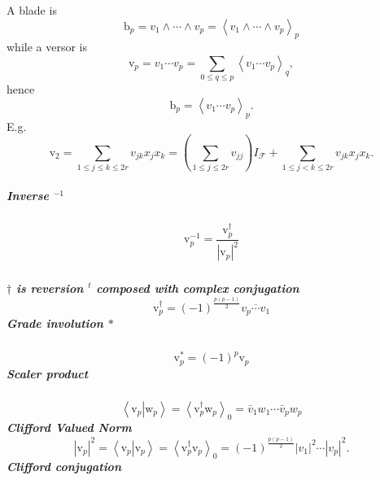 \documentclass[aps,preprint]{revtex4}%
\begin{document}
A blade is
\begin{equation}
\mathrm{b}_{p}=v_{1}\wedge\cdots\wedge v_{p}=\left\langle v_{1}\wedge
\cdots\wedge v_{p}\right\rangle _{p}%
\end{equation}
while a versor is
\begin{equation}
\mathrm{v}_{p}=v_{1}\cdots v_{p}=\sum_{0\leq q\leq p}\left\langle v_{1}\cdots
v_{p}\right\rangle _{q},
\end{equation}
hence
\begin{equation}
\mathrm{b}_{p}=\left\langle v_{1}\cdots v_{p}\right\rangle _{p}.
\end{equation}
E.g.%
\begin{equation}
\mathrm{v}_{2}=\sum_{1\leq j\leq k\leq2r}v_{jk}x_{j}x_{k}=\left(  \sum_{1\leq
j\leq2r}v_{jj}\right)  I_{\mathcal{F}}+\sum_{1\leq j<k\leq2r}v_{jk}x_{j}x_{k}.
\end{equation}


\subparagraph{Inverse $^{-1}$}

\subparagraph{%
\begin{equation}
\mathrm{v}_{p}^{-1}=\frac{\mathrm{v}_{p}^{\dagger}}{\left\vert \mathrm{v}%
_{p}\right\vert ^{2}}%
\end{equation}
}

\subparagraph{$\dagger$ is reversion $^{t}$ composed with complex conjugation
\begin{equation}
\mathrm{v}_{p}^{\dagger}=\left(  -1\right)  ^{\frac{p\left(  p-1\right)  }{2}%
}\overline{v_{p}\cdots v_{1}}%
\end{equation}
Grade involution $\ast$}

\subparagraph{%
\begin{equation}
\mathrm{v}_{p}^{\ast}=\left(  -1\right)  ^{p}\mathrm{v}_{p}%
\end{equation}
Scaler product}

\subparagraph{%
\begin{equation}
\left\langle \left.  \mathrm{v}_{p}\right\vert \mathrm{w}_{p}\right\rangle
=\left\langle \mathrm{v}_{p}^{\dagger}\mathrm{w}_{p}\right\rangle _{0}=\bar
{v}_{1}w_{1}\cdots\bar{v}_{p}w_{p}%
\end{equation}
Clifford Valued Norm
\begin{equation}
\left\vert \mathrm{v}_{p}\right\vert ^{2}=\left\langle \left.  \mathrm{v}%
_{p}\right\vert \mathrm{v}_{p}\right\rangle =\left\langle \mathrm{v}%
_{p}^{\dagger}\mathrm{v}_{p}\right\rangle _{0}=\left(  -1\right)
^{\frac{p\left(  p-1\right)  }{2}}\left\vert v_{1}\right\vert ^{2}%
\cdots\left\vert v_{p}\right\vert ^{2}.
\end{equation}
Clifford conjugation}%
\end{document}
